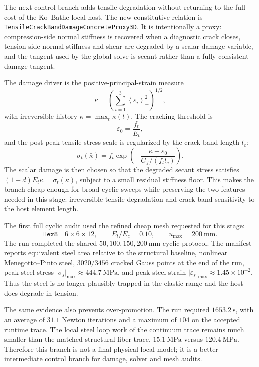 The next control branch adds tensile degradation without returning to the full
cost of the Ko--Bathe local host. The new constitutive relation is
\texttt{TensileCrackBandDamageConcreteProxy3D}. It is intentionally a proxy:
compression-side normal stiffness is recovered when a diagnostic crack closes,
tension-side normal stiffness and shear are degraded by a scalar damage
variable, and the tangent used by the global solve is secant rather than a
fully consistent damage tangent.

The damage driver is the positive-principal-strain measure
\begin{equation}
  \kappa =
  \left(
    \sum_{i=1}^{3} \left\langle \varepsilon_i \right\rangle_+^2
  \right)^{1/2},
\end{equation}
with irreversible history \(\bar\kappa=\max_t \kappa(t)\). The cracking
threshold is
\begin{equation}
  \varepsilon_0 = \frac{f_t}{E_t},
\end{equation}
and the post-peak tensile stress scale is regularized by the crack-band
length \(l_c\):
\begin{equation}
  \sigma_t(\bar\kappa)
  =
  f_t
  \exp\!\left(
    -\frac{\bar\kappa-\varepsilon_0}
           {G_f/(f_t l_c)}
  \right).
\end{equation}
The scalar damage is then chosen so that the degraded secant stress satisfies
\((1-d)E_t\bar\kappa=\sigma_t(\bar\kappa)\), subject to a small residual
stiffness floor. This makes the branch cheap enough for broad cyclic sweeps
while preserving the two features needed in this stage: irreversible tensile
degradation and crack-band sensitivity to the host element length.

The first full cyclic audit used the refined cheap mesh requested for this
stage:
\[
  \texttt{Hex8}\quad 6\times6\times12,\qquad
  E_t/E_c=0.10,\qquad
  u_{\max}=200~\mathrm{mm}.
\]
The run completed the shared \(50,100,150,200~\mathrm{mm}\) cyclic protocol.
The manifest reports equivalent steel area relative to the structural
baseline, nonlinear Menegotto--Pinto steel, \(3020/3456\) cracked Gauss
points at the end of the run, peak steel stress
\(|\sigma_s|_{\max}\approx444.7~\mathrm{MPa}\), and peak steel strain
\(|\varepsilon_s|_{\max}\approx1.45\times10^{-2}\). Thus the steel is no
longer plausibly trapped in the elastic range and the host does degrade in
tension.

The same evidence also prevents over-promotion. The run required
\(1653.2~\mathrm{s}\), with an average of \(31.1\) Newton iterations and a
maximum of \(104\) on the accepted runtime trace. The local steel loop work of
the continuum trace remains much smaller than the matched structural fiber
trace, \(15.1~\mathrm{MPa}\) versus \(120.4~\mathrm{MPa}\). Therefore this
branch is not a final physical local model; it is a better intermediate
control branch for damage, solver and mesh audits.

